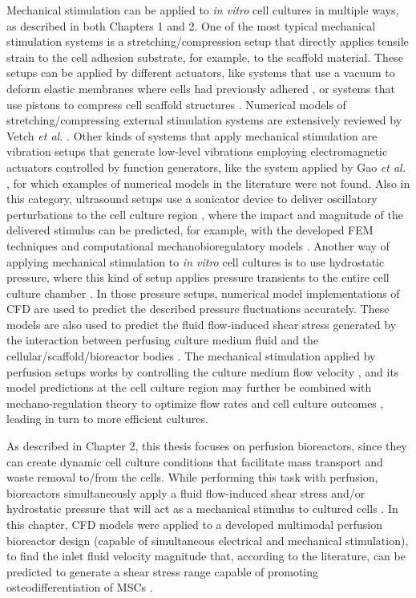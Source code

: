 Mechanical stimulation can be applied to \textit{in vitro} cell cultures in multiple ways, as described in both Chapters 1 and 2. One of the most typical mechanical stimulation systems is a stretching/compression setup that directly applies tensile strain to the cell adhesion substrate, for example, to the scaffold material. These setups can be applied by different actuators, like systems that use a vacuum to deform elastic membranes where cells had previously adhered \cite{Wang2017-bk}, or systems that use pistons to compress cell scaffold structures \cite{Schreivogel2019-ec, Friedl2007-ux, Sandino2008-fn}. Numerical models of stretching/compressing external stimulation systems are extensively reviewed by Vetch \textit{et al.} \cite{Vetsch2015-xz}. Other kinds of systems that apply mechanical stimulation are vibration setups that generate low-level vibrations employing electromagnetic actuators controlled by function generators, like the system applied by Gao \textit{et al.} \cite{Gao2017-pn}, for which examples of numerical models in the literature were not found. Also in this category, ultrasound setups use a sonicator device to deliver oscillatory perturbations to the cell culture region \cite{Liu2022-kf, Uddin2013-xh}, where the impact and magnitude of the delivered stimulus can be predicted, for example, with the developed \ac{FEM} techniques and computational mechanobioregulatory models \cite{Grivas2019-ab}. Another way of applying mechanical stimulation to \textit{in vitro} cell cultures is to use hydrostatic pressure, where this kind of setup applies pressure transients to the entire cell culture chamber \cite{Henstock2013-co, Nesler2016-le, Stavenschi2018-ze}. In those pressure setups, numerical model implementations of \ac{CFD} are used to predict the described pressure fluctuations accurately. These models are also used to predict the fluid flow-induced shear stress generated by the interaction between perfusing culture medium fluid and the cellular/scaffold/bioreactor bodies \cite{Hidalgo-Bastida2012-tp}. The mechanical stimulation applied by perfusion setups works by controlling the culture medium flow velocity \cite{Banka2012-uo}, and its model predictions at the cell culture region may further be combined with mechano-regulation theory to optimize flow rates and cell culture outcomes \cite{Zhao2018-ci}, leading in turn to more efficient cultures. 

As described in Chapter 2, this thesis focuses on perfusion bioreactors, since they can create dynamic cell culture conditions that facilitate mass transport and waste removal to/from the cells. While performing this task with perfusion, bioreactors simultaneously apply a fluid flow-induced shear stress and/or hydrostatic pressure that will act as a mechanical stimulus to cultured cells \cite{McCoy2010-hy, Bhaskar2018-cr, Beskardes2018-fq, Lovecchio2019-ut, Sart2016-uq}. In this chapter, \ac{CFD} models were applied to a developed multimodal perfusion bioreactor design (capable of simultaneous electrical and mechanical stimulation), to find the inlet fluid velocity magnitude that, according to the literature, can be predicted to generate a shear stress range capable of promoting osteodifferentiation of \ac{MSCs} \cite{Zhao2018-ci}. 

